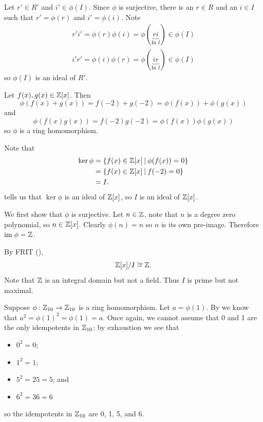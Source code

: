\begin{questions}
\begin{partquestions}{\alph*}
        Let $r' \in R'$ and $i' \in \phi(I)$. Since $\phi$ is surjective, there is an $r \in R$ and an $i \in I$ such that $r' = \phi(r)$ and $i' = \phi(i)$. Note
        \begin{align*}
            r'i' = \phi(r)\phi(i) = \phi(\underbrace{ri}_{\text{In }I}) \in \phi(I)\\
            i'r' = \phi(i)\phi(r) = \phi(\underbrace{ir}_{\text{In }I}) \in \phi(I)
        \end{align*}
        so $\phi(I)$ is an ideal of $R'$.
    \end{partquestions}

    \item \begin{partquestions}{\roman*}
        \item Let $f(x), g(x) \in \mathbb{Z}[x]$. Then
        \[
            \phi(f(x) + g(x)) = f(-2) + g(-2) = \phi(f(x)) + \phi(g(x))
        \]
        and
        \[
            \phi(f(x)g(x)) = f(-2)g(-2) = \phi(f(x))\phi(g(x))
        \]
        so $\phi$ is a ring homomorphism.

        \item Note that
        \begin{align*}
            \ker\phi &= \{f(x) \in \Z[x] \vert \phi(f(x)) = 0\}\\
            &= \{f(x) \in \Z[x] \vert f(-2) = 0\}\\
            &= I.
        \end{align*}
         tells us that $\ker\phi$ is an ideal of $\mathbb{Z}[x]$, so $I$ is an ideal of $\mathbb{Z}[x]$.

        \item We first show that $\phi$ is surjective. Let $n \in \mathbb{Z}$, note that $n$ is a degree zero polynomial, so $n \in \mathbb{Z}[x]$. Clearly $\phi(n) = n$ so $n$ is its own pre-image. Therefore $\mathrm{im}\;\phi = \mathbb{Z}$.
        
        By FRIT (),
        \[
            \mathbb{Z}[x]/I \cong \mathbb{Z}.
        \]
        Note that $\mathbb{Z}$ is an integral domain but not a field. Thus $I$ is prime but not maximal.
    \end{partquestions}

    \item Suppose $\phi: \mathbb{Z}_{10}\to\mathbb{Z}_{10}$ is a ring homomorphism. Let $a = \phi(1)$. By  we know that $a^2 = \phi(1)^2 = \phi(1) = a$. Once again, we cannot assume that 0 and 1 are the only idempotents in $\mathbb{Z}_{10}$; by exhaustion we see that
    \begin{itemize}
        \item $0^2 = 0$;
        \item $1^2 = 1$;
        \item $5^2 = 25 = 5$; and
        \item $6^2 = 36 = 6$
    \end{itemize}
    so the idempotents in $\mathbb{Z}_{10}$ are 0, 1, 5, and 6.


\end{questions}
